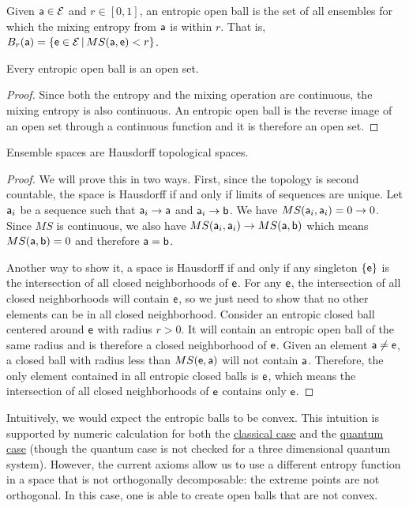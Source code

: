 \begin{mathSection}
\begin{defn}
	Given $\ens[a] \in \Ens$ and $r \in [0,1]$, an entropic open ball is the set of all ensembles for which the mixing entropy from $\ens[a]$ is within $r$. That is, $B_r(\ens[a]) = \{\ens \in \Ens \, | \, MS(\ens[a], \ens) < r\}$.
\end{defn}
\begin{coro}
	Every entropic open ball is an open set.
\end{coro}

\begin{proof}
	Since both the entropy and the mixing operation are continuous, the mixing entropy is also continuous. An entropic open ball is the reverse image of an open set through a continuous function and it is therefore an open set.
\end{proof}

\begin{prop}
	Ensemble spaces are Hausdorff topological spaces.
\end{prop}

\begin{proof}
	We will prove this in two ways. First, since the topology is second countable, the space is Hausdorff if and only if limits of sequences are unique. Let $\ens[a]_i$ be a sequence such that $\ens[a]_i \to \ens[a]$ and $\ens[a]_i \to \ens[b]$. We have $MS(\ens[a]_i, \ens[a]_i) = 0 \to 0$. Since $MS$ is continuous, we also have $MS(\ens[a]_i, \ens[a]_i) \to MS(\ens[a], \ens[b])$ which means $MS(\ens[a], \ens[b]) = 0$ and therefore $\ens[a] = \ens[b]$.
	
	Another way to show it, a space is Hausdorff if and only if any singleton $\{\ens\}$ is the intersection of all closed neighborhoods of $\ens$. For any $\ens$, the intersection of all closed neighborhoods will contain $\ens$, so we just need to show that no other elements can be in all closed neighborhood. Consider an entropic closed ball centered around $\ens$ with radius $r>0$. It will contain an entropic open ball of the same radius and is therefore a closed neighborhood of $\ens$. Given an element $\ens[a] \neq \ens$, a closed ball with radius less than $MS(\ens, \ens[a])$ will not contain $\ens[a]$. Therefore, the only element contained in all entropic closed balls is $\ens$, which means the intersection of all closed neighborhoods of $\ens$ contains only $\ens$.
\end{proof}

\begin{remark}
	Intuitively, we would expect the entropic balls to be convex. This intuition is supported by numeric calculation for both the \href{https://www.desmos.com/calculator/ama0u3u31d}{classical case} and the \href{https://www.desmos.com/calculator/6ga2hygwmm}{quantum case} (though the quantum case is not checked for a three dimensional quantum system). However, the current axioms allow us to use a different entropy function in a space that is not orthogonally decomposable: the extreme points are not orthogonal. In this case, one is able to create open balls that are not convex.
	

\end{remark}
\end{mathSection}
